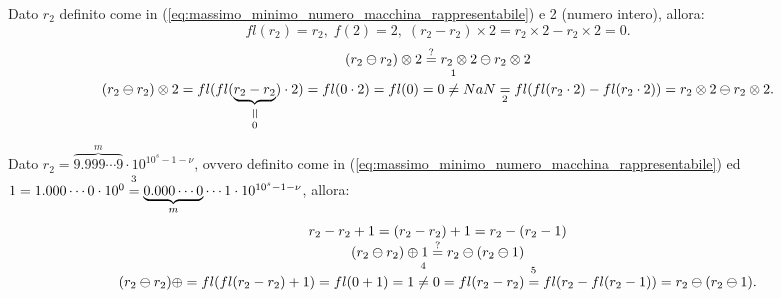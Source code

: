 \begin{example}
	Dato $r_2$ definito come in (\ref{eq:massimo_minimo_numero_macchina_rappresentabile}) e 2 (numero intero), allora:
	\begin{equation*}
		fl(r_2)=r_2,\; f(2)=2,\; (r_2-r_2)\times 2= r_2\times 2- r_2\times 2=0. 
	\end{equation*}
	\begin{equation*}
		\begin{matrix}
			(r_2\ominus r_2)\otimes 2 \overset{?}{=}r_2\otimes 2\ominus r_2\otimes 2\\
			(r_2\ominus r_2)\otimes 2 = fl(fl(\equalto{\underbrace{r_2-r_2}}{0})\cdot2)=fl(0\cdot 2)=fl(0)=0\overset{\footnotemark}{\neq} NaN \underset{\footnotemark}{=}fl(fl(r_2\cdot 2)-fl({r_2\cdot 2}))= r_2\otimes 2\ominus r_2\otimes 2.
		\end{matrix}
	\end{equation*}
	
	\addtocounter{footnote}{-1}
	
	
\end{example}
\begin{example}
	Dato $r_2=\overbrace{9.999\cdots 9}^{m}\cdot 10^{10^s-1-\nu}$, ovvero definito come in (\ref{eq:massimo_minimo_numero_macchina_rappresentabile}) ed $1=1.000\cdots 0\cdot 10^0\overset{\footnotemark}{=}\underbrace{0.000\cdots 0}_{m}\cdots 1\cdot 10^{10^s-1-\nu}$,  allora:
	\begin{equation*}
		\begin{matrix}
			r_2-r_2+1=(r_2-r_2)+1=r_2-(r_2-1)\\
			(r_2\ominus r_2)\oplus 1 \overset{?}{=} r_2\ominus(r_2\ominus1)\\
			(r_2\ominus r_2)\oplus=fl(fl(r_2-r_2)+1)=fl(0+1)=1\overset{\footnotemark}{\neq} 0=fl(r_2-r_2)\overset{\footnotemark}{=}fl(r_2-fl(r_2-1))=r_2\ominus(r_2\ominus 1).
		\end{matrix}
	\end{equation*}
	\addtocounter{footnote}{-1}
	
\end{example}

